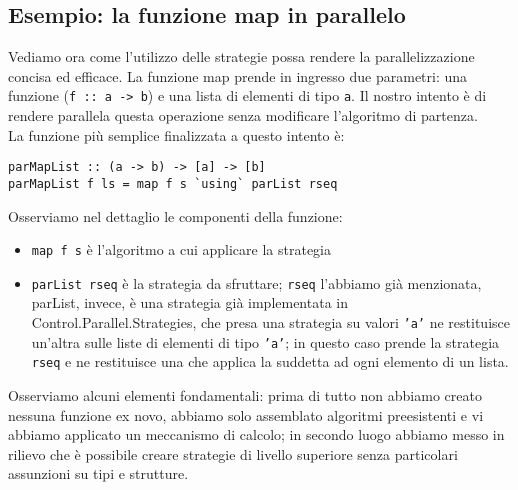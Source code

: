 \subsection{Esempio: la funzione map in parallelo}
Vediamo ora come l'utilizzo delle strategie possa rendere la parallelizzazione concisa ed efficace. La funzione map prende in ingresso due parametri: una funzione (\texttt{f :: a -> b}) e una lista di elementi di tipo \texttt{a}. Il nostro intento è di rendere parallela questa operazione senza modificare l'algoritmo di partenza.\\
La funzione più semplice finalizzata a questo intento è:
\begin{verbatim}
parMapList :: (a -> b) -> [a] -> [b]
parMapList f ls = map f s `using` parList rseq
\end{verbatim}
Osserviamo nel dettaglio le componenti della funzione:
\begin{itemize}
\item{\texttt{map f s} è l'algoritmo a cui applicare la strategia}
\item{\texttt{parList rseq} è la strategia da sfruttare; \texttt{rseq} l'abbiamo già menzionata, parList, invece, è una strategia già implementata in Control.Parallel.Strategies, che presa una strategia su valori \texttt{'a'} ne restituisce un'altra sulle liste di elementi di tipo \texttt{'a'}; in questo caso prende la strategia \texttt{rseq} e ne restituisce una che applica la suddetta ad ogni elemento di un lista.}
\end{itemize}
Osserviamo alcuni elementi fondamentali: prima di tutto non abbiamo creato nessuna funzione ex novo, abbiamo solo assemblato algoritmi preesistenti e vi abbiamo applicato un meccanismo di calcolo; in secondo luogo abbiamo messo in rilievo che è possibile creare strategie di livello superiore senza particolari assunzioni su tipi e strutture.

